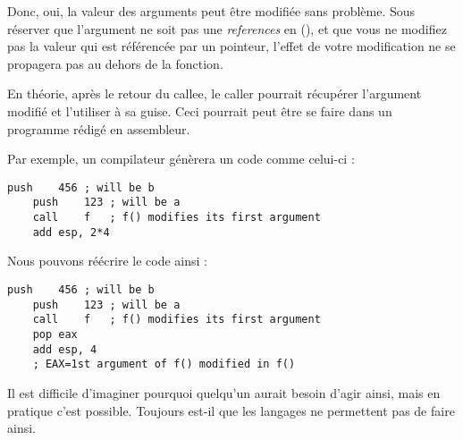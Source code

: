 


Donc, oui, la valeur des arguments peut être modifiée sans problème.
Sous réserver que l'argument ne soit pas une \emph{references} en \Cpp{} (),
et que vous ne modifiez pas la valeur qui est référencée par un pointeur, l'effet de votre modification 
ne se propagera pas au dehors de la fonction.

En théorie, après le retour du \gls{callee}, le \gls{caller} pourrait récupérer l'argument modifié et 
l'utiliser à sa guise.
Ceci pourrait peut être se faire dans un programme rédigé en assembleur.

Par exemple, un compilateur \CCpp génèrera un code comme celui-ci :

\begin{lstlisting}[style=customasmx86]
	push	456	; will be b
	push	123	; will be a
	call	f	; f() modifies its first argument
	add	esp, 2*4
\end{lstlisting}

Nous pouvons réécrire le code ainsi :

\begin{lstlisting}[style=customasmx86]
	push	456	; will be b
	push	123	; will be a
	call	f	; f() modifies its first argument
	pop	eax
	add	esp, 4
	; EAX=1st argument of f() modified in f()
\end{lstlisting}

Il est difficile d'imaginer pourquoi quelqu'un aurait besoin d'agir ainsi, mais en pratique 
c'est possible.
Toujours est-il que les langages \CCpp ne permettent pas de faire ainsi.


%

